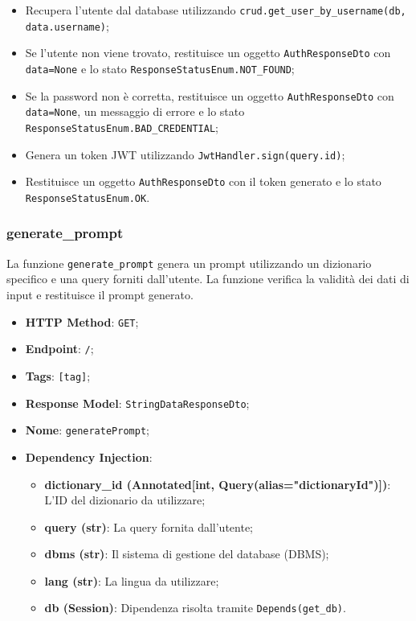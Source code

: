 \begin{itemize}
\item Recupera l'utente dal database utilizzando \texttt{crud.get\_user\_by\_username(db,\- data\-.username)};
\item Se l'utente non viene trovato, restituisce un oggetto \texttt{AuthResponseDto} con \texttt{data\-=\-None} e lo stato \texttt{ResponseStatusEnum.NOT\_FOUND};
\item Se la password non è corretta, restituisce un oggetto \texttt{AuthResponseDto} con \texttt{data\-=\-None}, un messaggio di errore e lo stato \texttt{ResponseStatusEnum.BAD\_CREDENTIAL};
\item Genera un token JWT utilizzando \texttt{JwtHandler.sign(query.id)};
\item Restituisce un oggetto \texttt{AuthResponseDto} con il token generato e lo stato \texttt{Response\-Status\-Enum.OK}.
\end{itemize}


\subsubsection{generate\_prompt}

\par La funzione \texttt{generate\_prompt} genera un prompt utilizzando un dizionario specifico e una query forniti dall'utente. La funzione verifica la validità dei dati di input e restituisce il prompt generato.

\begin{itemize}
\item \textbf{HTTP Method}: \texttt{GET};
\item \textbf{Endpoint}: \texttt{/};
\item \textbf{Tags}: \texttt{[tag]};
\item \textbf{Response Model}: \texttt{StringDataResponseDto};
\item \textbf{Nome}: \texttt{generatePrompt};
\item \textbf{Dependency Injection}:
\begin{itemize}
\item \textbf{dictionary\_id (Annotated[int, Query(alias="dictionaryId")])}: L'ID del dizionario da utilizzare;
\item \textbf{query (str)}: La query fornita dall'utente;
\item \textbf{dbms (str)}: Il sistema di gestione del database (DBMS);
\item \textbf{lang (str)}: La lingua da utilizzare;
\item \textbf{db (Session)}: Dipendenza risolta tramite \texttt{Depends(get\_db)}.
\end{itemize}
\end{itemize}

